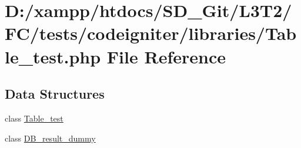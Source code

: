 \hypertarget{tests_2codeigniter_2libraries_2_table__test_8php}{}\section{D\+:/xampp/htdocs/\+S\+D\+\_\+\+Git/\+L3\+T2/\+F\+C/tests/codeigniter/libraries/\+Table\+\_\+test.php File Reference}
\label{tests_2codeigniter_2libraries_2_table__test_8php}
\subsection*{Data Structures}
\begin{DoxyCompactItemize}
\item 
class \hyperlink{class_table__test}{Table\+\_\+test}
\item 
class \hyperlink{class_d_b__result__dummy}{D\+B\+\_\+result\+\_\+dummy}
\end{DoxyCompactItemize}
